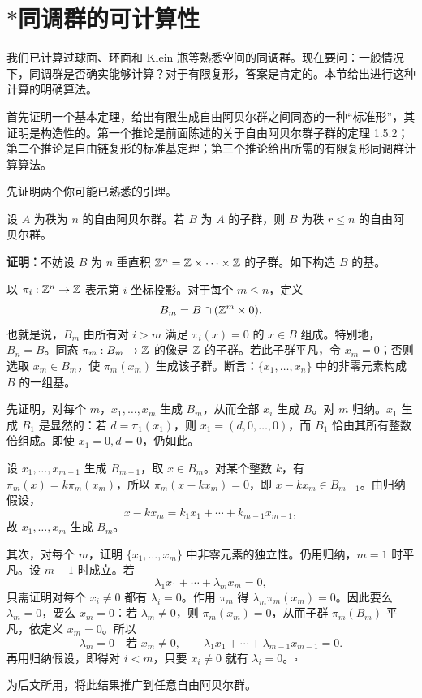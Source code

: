 \section{\texorpdfstring{$*$}{*}同调群的可计算性}
我们已计算过球面、环面和 Klein 瓶等熟悉空间的同调群。现在要问：一般情况下，同调群是否确实能够计算？对于有限复形，答案是肯定的。本节给出进行这种计算的明确算法。

首先证明一个基本定理，给出有限生成自由阿贝尔群之间同态的一种“标准形”，其证明是构造性的。第一个推论是前面陈述的关于自由阿贝尔群子群的定理 1.5.2；第二个推论是自由链复形的标准基定理；第三个推论给出所需的有限复形同调群计算算法。

先证明两个你可能已熟悉的引理。

设 $A$ 为秩为 $n$ 的自由阿贝尔群。若 $B$ 为 $A$ 的子群，则 $B$ 为秩 $r\leq n$ 的自由阿贝尔群。

\noindent\textbf{证明：}不妨设 $B$ 为 $n$ 重直积 $\mathbb{Z}^n=\mathbb{Z}\times\cdots\times\mathbb{Z}$ 的子群。如下构造 $B$ 的基。

以 $\pi_i:\mathbb{Z}^n\to\mathbb{Z}$ 表示第 $i$ 坐标投影。对于每个 $m\leq n$，定义
\[
B_m=B\cap(\mathbb{Z}^m\times0).
\]
也就是说，$B_m$ 由所有对 $i>m$ 满足 $\pi_i(x)=0$ 的 $x\in B$ 组成。特别地，$B_n=B$。同态 $\pi_m:B_m\to\mathbb{Z}$ 的像是 $\mathbb{Z}$ 的子群。若此子群平凡，令 $x_m=0$；否则选取 $x_m\in B_m$，使 $\pi_m(x_m)$ 生成该子群。断言：$\{x_1,\ldots,x_n\}$ 中的非零元素构成 $B$ 的一组基。

先证明，对每个 $m$，$x_1,\ldots,x_m$ 生成 $B_m$，从而全部 $x_i$ 生成 $B$。对 $m$ 归纳。$x_1$ 生成 $B_1$ 是显然的：若 $d=\pi_1(x_1)$，则 $x_1=(d,0,\ldots,0)$，而 $B_1$ 恰由其所有整数倍组成。即使 $x_1=0,d=0$，仍如此。

设 $x_1,\ldots,x_{m-1}$ 生成 $B_{m-1}$，取 $x\in B_m$。对某个整数 $k$，有 $\pi_m(x)=k\pi_m(x_m)$，所以 $\pi_m(x-kx_m)=0$，即 $x-kx_m\in B_{m-1}$。由归纳假设，
\[
x-kx_m=k_1x_1+\cdots+k_{m-1}x_{m-1},
\]
故 $x_1,\ldots,x_m$ 生成 $B_m$。

其次，对每个 $m$，证明 $\{x_1,\ldots,x_m\}$ 中非零元素的独立性。仍用归纳，$m=1$ 时平凡。设 $m-1$ 时成立。若
\[
\lambda_1x_1+\cdots+\lambda_mx_m=0,
\]
只需证明对每个 $x_i\ne0$ 都有 $\lambda_i=0$。作用 $\pi_m$ 得 $\lambda_m\pi_m(x_m)=0$。因此要么 $\lambda_m=0$，要么 $x_m=0$：若 $\lambda_m\ne0$，则 $\pi_m(x_m)=0$，从而子群 $\pi_m(B_m)$ 平凡，依定义 $x_m=0$。所以
\[
\lambda_m=0\quad\text{若 }x_m\ne0,\qquad
\lambda_1x_1+\cdots+\lambda_{m-1}x_{m-1}=0.
\]
再用归纳假设，即得对 $i<m$，只要 $x_i\ne0$ 就有 $\lambda_i=0$。\hfill$\square$

为后文所用，将此结果推广到任意自由阿贝尔群。

